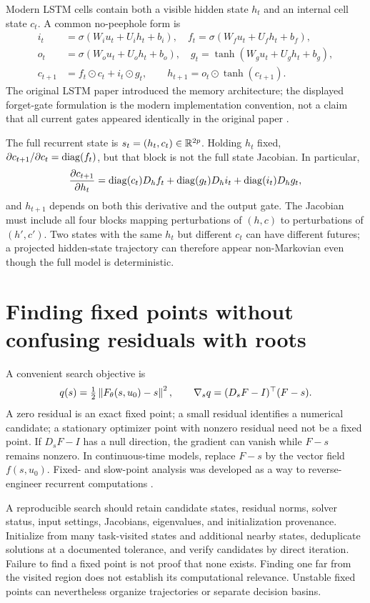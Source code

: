 Modern LSTM cells contain both a visible hidden state $h_t$ and an internal cell state $c_t$. A common no-peephole form is
\begin{align}
 i_t&=\sigma(W_iu_t+U_ih_t+b_i),\quad
 f_t=\sigma(W_fu_t+U_fh_t+b_f),\\
 o_t&=\sigma(W_ou_t+U_oh_t+b_o),\quad
 g_t=\tanh(W_gu_t+U_gh_t+b_g),\\
 c_{t+1}&=f_t\odot c_t+i_t\odot g_t,\qquad
 h_{t+1}=o_t\odot\tanh(c_{t+1}).\label{eq:10-lstm}
\end{align}
The original LSTM paper introduced the memory architecture; the displayed forget-gate formulation is the modern implementation convention, not a claim that all current gates appeared identically in the original paper \citep{app_hochreiter1997,app_torchlstm}.

The full recurrent state is $s_t=(h_t,c_t)\in\mathbb{R}^{2p}$. Holding $h_t$ fixed, $\partial c_{t+1}/\partial c_t=\operatorname{diag}(f_t)$, but that block is not the full state Jacobian. In particular,
\[
 \frac{\partial c_{t+1}}{\partial h_t}
 =\operatorname{diag}(c_t)D_hf_t+\operatorname{diag}(g_t)D_hi_t+\operatorname{diag}(i_t)D_hg_t,
\]
and $h_{t+1}$ depends on both this derivative and the output gate. The Jacobian must include all four blocks mapping perturbations of $(h,c)$ to perturbations of $(h',c')$. Two states with the same $h_t$ but different $c_t$ can have different futures; a projected hidden-state trajectory can therefore appear non-Markovian even though the full model is deterministic.

\section{Finding fixed points without confusing residuals with roots}
\label{sec:10-fp}
A convenient search objective is
\begin{equation}
 q(s)=\tfrac12\left\lVert F_\theta(s,u_0)-s\right\rVert^2,
 \qquad \nabla_s q=(D_sF-I)^\top(F-s).
 \label{eq:10-residual}
\end{equation}
A zero residual is an exact fixed point; a small residual identifies a numerical candidate; a stationary optimizer point with nonzero residual need not be a fixed point. If $D_sF-I$ has a null direction, the gradient can vanish while $F-s$ remains nonzero. In continuous-time models, replace $F-s$ by the vector field $f(s,u_0)$. Fixed- and slow-point analysis was developed as a way to reverse-engineer recurrent computations \citep{app_sussillo2013}.

A reproducible search should retain candidate states, residual norms, solver status, input settings, Jacobians, eigenvalues, and initialization provenance. Initialize from many task-visited states and additional nearby states, deduplicate solutions at a documented tolerance, and verify candidates by direct iteration. Failure to find a fixed point is not proof that none exists. Finding one far from the visited region does not establish its computational relevance. Unstable fixed points can nevertheless organize trajectories or separate decision basins.

